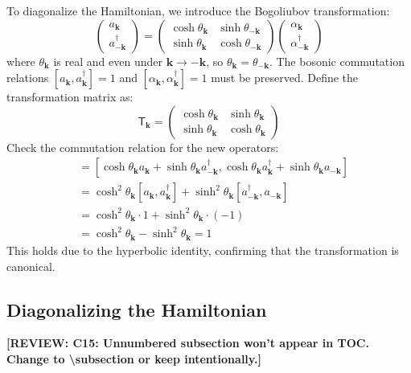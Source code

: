 \documentclass[aps, prx, nofootinbib, superscriptaddress]{revtex4-2}
\newcommand{\REVIEW}[1]{{\color{reviewcolor}\bfseries [REVIEW: #1]}}
\newcommand{\kvec}{\mathbf{k}}
\begin{document}
To diagonalize the Hamiltonian, we introduce the Bogoliubov transformation:
\begin{equation}
    \begin{pmatrix}
        a_{\kvec} \\
        a^{\dagger}_{-\kvec}
    \end{pmatrix}
    =
    \begin{pmatrix}
        \cosh \theta_{\kvec} & \sinh \theta_{-\kvec} \\
        \sinh \theta_{\kvec} & \cosh \theta_{-\kvec}
    \end{pmatrix}
    \begin{pmatrix}
        \alpha_{\kvec} \\
        \alpha^{\dagger}_{-\kvec}
    \end{pmatrix}
\end{equation}
where $ \theta_{\kvec} $ is real and even under $ \kvec \to -\kvec $, so $ \theta_{\kvec} = \theta_{-\kvec} $. The bosonic commutation relations $ [a_{\kvec}, a^{\dagger}_{\kvec}] = 1 $ and $ [\alpha_{\kvec}, \alpha^{\dagger}_{\kvec}] = 1 $ must be preserved. Define the transformation matrix as:
\begin{equation}
    \mathsf{T}_{\kvec} = 
    \begin{pmatrix}
        \cosh \theta_{\kvec} & \sinh \theta_{\kvec} \\
        \sinh \theta_{\kvec} & \cosh \theta_{\kvec}
    \end{pmatrix}
\end{equation}
Check the commutation relation for the new operators:
\begin{align}
    [\alpha_{\kvec}, \alpha^{\dagger}_{\kvec}] 
    &= [\cosh \theta_{\kvec} a_{\kvec} + \sinh \theta_{\kvec} a^{\dagger}_{-\kvec}, \cosh \theta_{\kvec} a^{\dagger}_{\kvec} + \sinh \theta_{\kvec} a_{-\kvec}]   \\
    &= \cosh^2 \theta_{\kvec} [a_{\kvec}, a^{\dagger}_{\kvec}] + \sinh^2 \theta_{\kvec} [a^{\dagger}_{-\kvec}, a_{-\kvec}]   \\
    &= \cosh^2 \theta_{\kvec} \cdot 1 + \sinh^2 \theta_{\kvec} \cdot (-1)   \\
    &= \cosh^2 \theta_{\kvec} - \sinh^2 \theta_{\kvec} = 1
\end{align}
This holds due to the hyperbolic identity, confirming that the transformation is canonical.

\subsection*{Diagonalizing the Hamiltonian}
\REVIEW{C15: Unnumbered subsection won't appear in TOC. Change to \textbackslash subsection or keep intentionally.}
\end{document}
